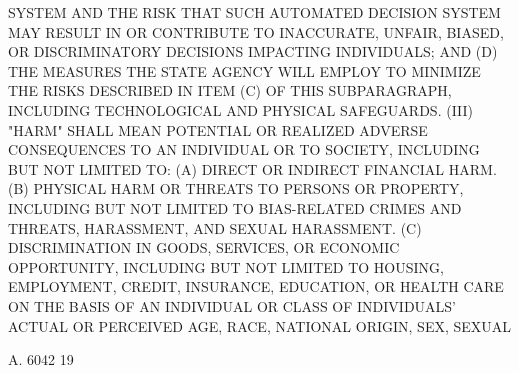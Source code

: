  SYSTEM AND THE RISK THAT SUCH AUTOMATED DECISION SYSTEM MAY RESULT IN OR
 CONTRIBUTE TO INACCURATE, UNFAIR, BIASED,  OR  DISCRIMINATORY  DECISIONS
 IMPACTING INDIVIDUALS; AND
   (D)  THE  MEASURES  THE STATE AGENCY WILL EMPLOY TO MINIMIZE THE RISKS
 DESCRIBED IN ITEM (C) OF THIS SUBPARAGRAPH, INCLUDING TECHNOLOGICAL  AND
 PHYSICAL SAFEGUARDS.
   (III)  "HARM" SHALL MEAN POTENTIAL OR REALIZED ADVERSE CONSEQUENCES TO
 AN INDIVIDUAL OR TO SOCIETY, INCLUDING BUT NOT LIMITED TO:
   (A) DIRECT OR INDIRECT FINANCIAL HARM.
   (B) PHYSICAL HARM OR THREATS TO PERSONS OR PROPERTY, INCLUDING BUT NOT
 LIMITED TO BIAS-RELATED  CRIMES  AND  THREATS,  HARASSMENT,  AND  SEXUAL
 HARASSMENT.
   (C)  DISCRIMINATION  IN  GOODS,  SERVICES,  OR  ECONOMIC  OPPORTUNITY,
 INCLUDING BUT NOT LIMITED TO  HOUSING,  EMPLOYMENT,  CREDIT,  INSURANCE,
 EDUCATION,  OR  HEALTH  CARE  ON  THE BASIS OF AN INDIVIDUAL OR CLASS OF
 INDIVIDUALS' ACTUAL OR PERCEIVED AGE, RACE, NATIONAL ORIGIN, SEX, SEXUAL

 A. 6042                            19
 
